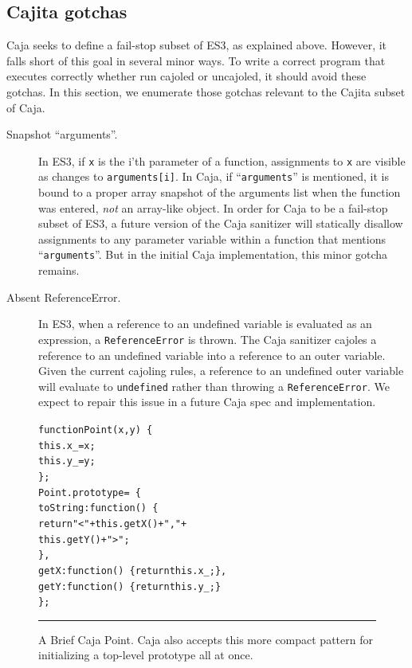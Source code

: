 \documentclass[letterpaper,twocolumn,10pt]{article}
\newcommand{\code}[1]{{\tt {#1}}}              %
\begin{document}
\subsection{Cajita gotchas}

Caja seeks to define a fail-stop subset of ES3, as explained above. However, 
it falls short of this goal in several minor ways. To write a correct program 
that executes correctly whether run cajoled or uncajoled, it should 
avoid these gotchas. In this section, we enumerate those gotchas relevant to 
the Cajita subset of Caja.

\begin{description}

  \item[Snapshot ``arguments''.] In ES3, if \code{x} is the i'th parameter of 
  a function, assignments to \code{x} are visible as changes to 
  \code{arguments[i]}. In Caja, if ``\code{arguments}'' is mentioned, it is 
  bound to a proper array snapshot of the arguments list when the function 
  was entered, \emph{not} an array-like object. In order for Caja to be a 
  fail-stop subset of ES3, a future version of the Caja sanitizer will 
  statically disallow assignments to any parameter variable within a function 
  that mentions ``\code{arguments}''. But in the initial Caja implementation, 
  this minor gotcha remains.
  
  \item[Absent ReferenceError.] In ES3, when a reference to an undefined 
  variable is evaluated as an expression, a \code{ReferenceError} is thrown. 
  The Caja sanitizer cajoles a reference to an undefined variable into a 
  reference to an outer variable. Given the current cajoling rules, a 
  reference to an undefined outer variable will evaluate to \code{undefined} 
  rather than throwing a \code{ReferenceError}. We expect to repair this 
  issue in a future Caja spec and implementation.
  
\end{description}

\begin{figure}[t!]
\begin{alltt}
function Point(x, y)\ \{
  this.x\_ = x;
  this.y\_ = y;
\};
Point.prototype =\ \{
  toString: function()\ \{ 
    return "<" + this.getX() + "," + 
                 this.getY() + ">"; 
  \},
  getX: function()\ \{ return this.x\_; \},
  getY: function()\ \{ return this.y\_; \}
\};
\end{alltt}

\caption[A Brief Caja Point.]{A Brief Caja Point. Caja also accepts this more 
compact pattern for initializing a top-level prototype all at once. \\ } 
\hrule
\label{fig:brief-caja-point}
\end{figure}
\end{document}
